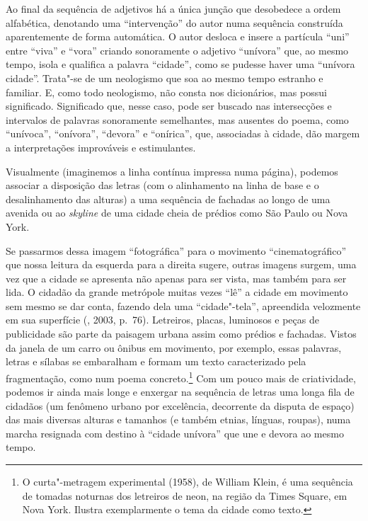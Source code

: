 Ao final da sequência de adjetivos há a única junção que desobedece a
ordem alfabética, denotando uma ``intervenção'' do autor numa sequência
construída aparentemente de forma automática. O autor desloca e insere a
partícula ``uni'' entre ``viva'' e ``vora'' criando sonoramente o
adjetivo ``unívora'' que, ao mesmo tempo, isola e qualifica a palavra
``cidade'', como se pudesse haver uma ``unívora cidade''. Trata"-se de um
neologismo que soa ao mesmo tempo estranho e familiar. E, como todo
neologismo, não consta nos dicionários, mas possui significado.
Significado que, nesse caso, pode ser buscado nas intersecções e
intervalos de palavras sonoramente semelhantes, mas ausentes do poema,
como ``unívoca'', ``onívora'', ``devora'' e ``onírica'', que, associadas
à cidade, dão margem a interpretações improváveis e estimulantes.

Visualmente (imaginemos a linha contínua impressa numa página), podemos
associar a disposição das letras (com o alinhamento na linha de base e o
desalinhamento das alturas) a uma sequência de fachadas ao longo de uma
avenida ou ao \emph{skyline} de uma cidade cheia de prédios como São
Paulo ou Nova York.

Se passarmos dessa imagem ``fotográfica'' para o movimento
``cinematográfico'' que nossa leitura da esquerda para a direita sugere,
outras imagens surgem, uma vez que a cidade se apresenta não apenas para
ser vista, mas também para ser lida. O cidadão da grande metrópole
muitas vezes ``lê'' a cidade em movimento sem mesmo se dar conta,
fazendo dela uma ``cidade"-tela'', apreendida velozmente em sua
superfície (, 2003, p.~76). Letreiros, placas, luminosos e peças
de publicidade são parte da paisagem urbana assim como prédios e
fachadas. Vistos da janela de um carro ou ônibus em movimento, por
exemplo, essas palavras, letras e sílabas se embaralham e formam um
texto caracterizado pela fragmentação, como num poema
concreto.\footnote{O curta"-metragem experimental {} (1958), de William Klein, é uma sequência de tomadas noturnas
  dos letreiros de neon, na região da Times Square, em Nova York.
  Ilustra exemplarmente o tema da cidade como texto.} Com um pouco mais
de criatividade, podemos ir ainda mais longe e enxergar na sequência de
letras uma longa fila de cidadãos (um fenômeno urbano por excelência,
decorrente da disputa de espaço) das mais diversas alturas e tamanhos (e
também etnias, línguas, roupas), numa marcha resignada com destino à
``cidade unívora'' que une e devora ao mesmo tempo.

